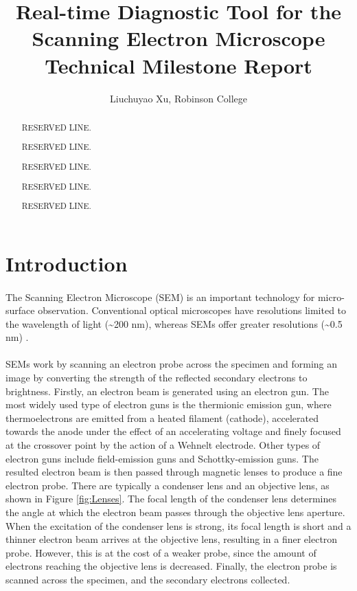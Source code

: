 \documentclass[12pt,a4paper]{article}
\title{Real-time Diagnostic Tool for the Scanning Electron Microscope Technical Milestone Report}
\author{Liuchuyao Xu, Robinson College}
\affil{Supervisor: Dr David Holburn}
\begin{document}
\maketitle

\begin{abstract}
RESERVED LINE.

RESERVED LINE.

RESERVED LINE.

RESERVED LINE.

RESERVED LINE.
\end{abstract}

\section{Introduction}
\paragraph{}
The Scanning Electron Microscope (SEM) is an important technology for micro-surface observation. Conventional optical microscopes have resolutions limited to the wavelength of light (\textasciitilde 200 nm), whereas SEMs offer greater resolutions (\textasciitilde 0.5 nm) \cite{JEOL}.

\paragraph{}
SEMs work by scanning an electron probe across the specimen and forming an image by converting the strength of the reflected secondary electrons to brightness. Firstly, an electron beam is generated using an electron gun. The most widely used type of electron guns is the thermionic emission gun, where thermoelectrons are emitted from a heated filament (cathode), accelerated towards the anode under the effect of an accelerating voltage and finely focused at the crossover point by the action of a Wehnelt electrode. Other types of electron guns include field-emission guns and Schottky-emission guns. The resulted electron beam is then passed through magnetic lenses to produce a fine electron probe. There are typically a condenser lens and an objective lens, as shown in Figure \ref{fig:Lenses}. The focal length of the condenser lens determines the angle at which the electron beam passes through the objective lens aperture. When the excitation of the condenser lens is strong, its focal length is short and a thinner electron beam arrives at the objective lens, resulting in a finer electron probe. However, this is at the cost of a weaker probe, since the amount of electrons reaching the objective lens is decreased. Finally, the electron probe is scanned across the specimen, and the secondary electrons collected.
\end{document}
